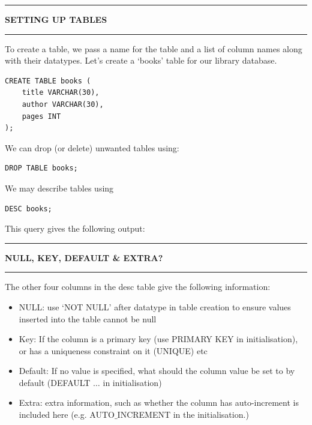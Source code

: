 \documentclass[8pt]{extarticle}
\newcommand{\heading}[1]{%
    \noindent
    \rule{\linewidth}{0.4pt}
    \begin{center}
        \vspace{-1ex}
        \textbf{#1}        
        \vspace{-2.5ex}
    \end{center}
    \rule{\linewidth}{0.4pt}
}
\begin{document}
\begin{multicols}{4}
\vspace{1ex}
\heading{SETTING UP TABLES}

To create a table, we pass a name for the table and a list of column names along with their datatypes. Let's create a `books' table for our library database.

\vspace{0.5ex}
\begin{lstlisting}[style=sql]
CREATE TABLE books (
    title VARCHAR(30),
    author VARCHAR(30),
    pages INT
);
\end{lstlisting}
\vspace{0.5ex}

We can drop (or delete) unwanted tables using:

\vspace{0.5ex}
\begin{lstlisting}[style=sql]
DROP TABLE books;
\end{lstlisting}
\vspace{0.5ex}

We may describe tables using 

\vspace{0.5ex}
\begin{lstlisting}[style=sql]
DESC books;
\end{lstlisting}
\vspace{0.5ex}

 This query gives the following output:
 
 \vspace{1.5ex}
\vspace*{1.5ex}

\heading{NULL, KEY, DEFAULT \& EXTRA?}

The other four columns in the desc table give the following information:
\begin{itemize}[leftmargin=*]
    \item NULL: use `NOT NULL' after datatype in table creation to ensure values inserted into the table cannot be null
    \item Key: If the column is a primary key (use PRIMARY KEY in initialisation), or has a uniqueness constraint on it (UNIQUE) etc
    \item Default: If no value is specified, what should the column value be set to by default (DEFAULT $\ldots$ in initialisation)
    \item Extra: extra information, such as whether the column has auto-increment is included here (e.g. AUTO$\_$INCREMENT in the initialisation.)
\end{itemize}


\end{multicols}
\end{document}
